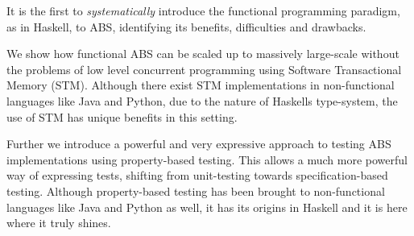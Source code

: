 \begin{itemize*}
	\item It is the first to \textit{systematically} introduce the functional programming paradigm, as in Haskell, to ABS, identifying its benefits, difficulties and drawbacks. 
	\item We show how functional ABS can be scaled up to massively large-scale without the problems of low level concurrent programming using Software Transactional Memory (STM). Although there exist STM implementations in non-functional languages like Java and Python, due to the nature of Haskells type-system, the use of STM has unique benefits in this setting.
	\item Further we introduce a powerful and very expressive approach to testing ABS implementations using property-based testing. This allows a much more powerful way of expressing tests, shifting from unit-testing towards specification-based testing. Although property-based testing has been brought to non-functional languages like Java and Python as well, it has its origins in Haskell and it is here where it truly shines.
\end{itemize*}

